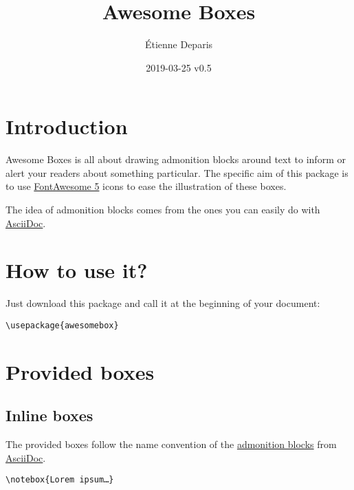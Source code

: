 \documentclass[a4paper,12pt]{article}
\title{Awesome Boxes}
\author{Étienne Deparis}
\date{2019-03-25 v0.5}
\newcommand\hrefcolor[2]{\textcolor{magenta}{\href{#1}{#2}}}
\begin{document}
\maketitle

\section{Introduction}

Awesome Boxes is all about drawing admonition blocks around text to
inform or alert your readers about something particular. The specific
aim of this package is to use
\hrefcolor{https://fontawesome.com/}{FontAwesome 5} icons to ease the
illustration of these boxes.

The idea of admonition blocks comes from the ones you can easily do with
\hrefcolor{http://asciidoctor.org/docs/user-manual/\#admonition}{AsciiDoc}.

\section{How to use it?}

Just download this package and call it at the beginning of your
document:

\begin{center}
\verb!\usepackage{awesomebox}!
\end{center}

\section{Provided boxes}
\subsection{Inline boxes}

The provided boxes follow the name convention of the
\hrefcolor{http://asciidoctor.org/docs/user-manual/\#admonition}{admonition
  blocks} from \hrefcolor{http://asciidoctor.org}{AsciiDoc}.

\begin{center}
\verb!\notebox{Lorem ipsum…}!
\end{center}

\end{document}
